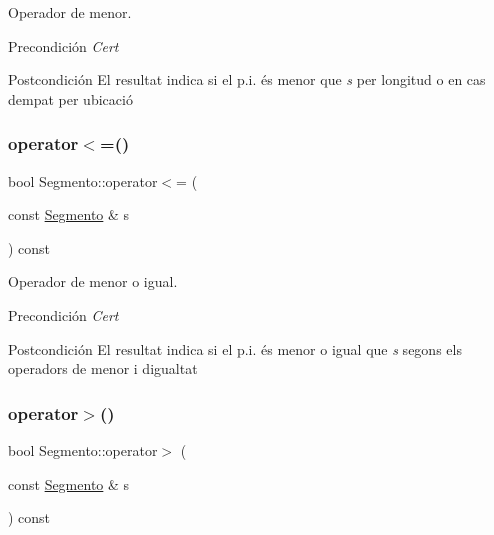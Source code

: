 Operador de menor. 

\begin{DoxyPrecond}{Precondición}
{\itshape Cert} 
\end{DoxyPrecond}
\begin{DoxyPostcond}{Postcondición}
El resultat indica si el p.\+i. és menor que {\itshape s} per longitud o en cas d\textquotesingle{}empat per ubicació 
\end{DoxyPostcond}
\mbox{\label{class_segmento_acc183ac638eab6f484d17ced4f66cf8e}} 
\subsubsection{\texorpdfstring{operator$<$=()}{operator<=()}}
{\footnotesize\ttfamily bool Segmento\+::operator$<$= (\begin{DoxyParamCaption}\item[{const \hyperlink{class_segmento}{Segmento} \&}]{s }\end{DoxyParamCaption}) const}



Operador de menor o igual. 

\begin{DoxyPrecond}{Precondición}
{\itshape Cert} 
\end{DoxyPrecond}
\begin{DoxyPostcond}{Postcondición}
El resultat indica si el p.\+i. és menor o igual que {\itshape s} segons els operadors de menor i d\textquotesingle{}igualtat 
\end{DoxyPostcond}
\mbox{\label{class_segmento_a01c2aa376384c7a75ef22196db361d2e}} 
\subsubsection{\texorpdfstring{operator$>$()}{operator>()}}
{\footnotesize\ttfamily bool Segmento\+::operator$>$ (\begin{DoxyParamCaption}\item[{const \hyperlink{class_segmento}{Segmento} \&}]{s }\end{DoxyParamCaption}) const}



